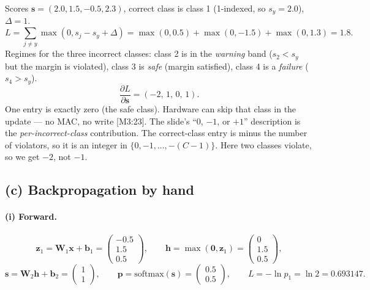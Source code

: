 \documentclass[11pt]{article}
\newcommand{\vct}[1]{\mathbf{#1}}
\newcommand{\mat}[1]{\mathbf{#1}}
\begin{document}
Scores \(\vct{s}=(2.0,1.5,-0.5,2.3)\), correct class is class 1
(1-indexed, so \(s_y=2.0\)), \(\Delta=1\).
\[
L=\sum_{j\neq y}\max(0,s_j-s_y+\Delta)
=\max(0,0.5)+\max(0,-1.5)+\max(0,1.3)
=1.8.
\]
Regimes for the three incorrect classes:
class 2 is in the \emph{warning} band (\(s_2<s_y\) but the margin is
violated), class 3 is \emph{safe} (margin satisfied), class 4 is a
\emph{failure} (\(s_4>s_y\)).
\[
\frac{\partial L}{\partial\vct{s}}=(-2,\,1,\,0,\,1).
\]
One entry is exactly zero (the safe class). Hardware can skip that
class in the update --- no MAC, no write [M3:23].
The slide's ``0, \(-1\), or \(+1\)'' description is the
\emph{per-incorrect-class} contribution. The correct-class entry is
minus the number of violators, so it is an integer in
\(\{0,-1,\ldots,-(C-1)\}\). Here two classes violate, so we get \(-2\),
not \(-1\).

\subsection*{(c) Backpropagation by hand}

\paragraph{(i) Forward.}
\[
\vct{z}_1
=\mat{W}_1\vct{x}+\vct{b}_1
=
\begin{pmatrix}-0.5\\1.5\\0.5\end{pmatrix},
\qquad
\vct{h}=\max(\vct{0},\vct{z}_1)
=
\begin{pmatrix}0\\1.5\\0.5\end{pmatrix},
\]
\[
\vct{s}=\mat{W}_2\vct{h}+\vct{b}_2
=
\begin{pmatrix}1\\1\end{pmatrix},
\qquad
\vct{p}=\mathrm{softmax}(\vct{s})
=
\begin{pmatrix}0.5\\0.5\end{pmatrix},
\qquad
L=-\ln p_1=\ln 2=0.693147.
\]
\end{document}
